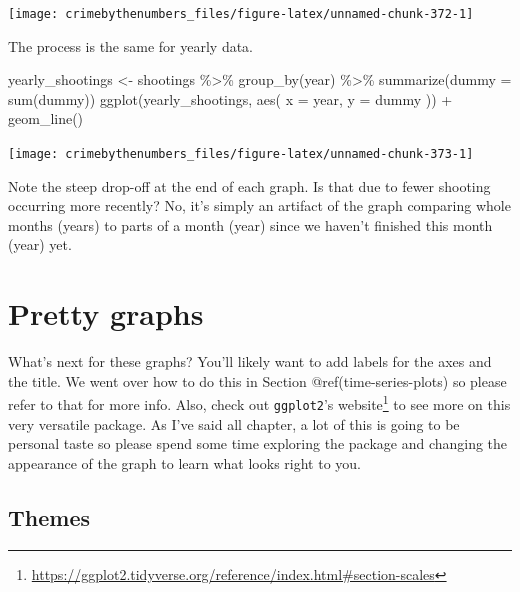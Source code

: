 \documentclass[
  a4paper,
]{krantz}
\makeatletter
\newenvironment{Shaded}{\begin{snugshade}}{\end{snugshade}}
\newcommand{\AttributeTok}[1]{\textcolor[rgb]{0.77,0.63,0.00}{#1}}
\newcommand{\FunctionTok}[1]{\textcolor[rgb]{0.00,0.00,0.00}{#1}}
\newcommand{\NormalTok}[1]{#1}
\newcommand{\OtherTok}[1]{\textcolor[rgb]{0.56,0.35,0.01}{#1}}
\newcommand{\SpecialCharTok}[1]{\textcolor[rgb]{0.00,0.00,0.00}{#1}}
\renewcommand{\href}[2]{#2\footnote{\url{#1}}}
\newenvironment{kframe}{%
\medskip{}
\setlength{\fboxsep}{.8em}
 \def\at@end@of@kframe{}%
 \ifinner\ifhmode%
  \def\at@end@of@kframe{\end{minipage}}%
  \begin{minipage}{\columnwidth}%
 \fi\fi%
 \def\FrameCommand##1{\hskip\@totalleftmargin \hskip-\fboxsep
 \colorbox{shadecolor}{##1}\hskip-\fboxsep
     \hskip-\linewidth \hskip-\@totalleftmargin \hskip\columnwidth}%
 \MakeFramed {\advance\hsize-\width
   \@totalleftmargin\z@ \linewidth\hsize
   \@setminipage}}%
 {\par\unskip\endMakeFramed%
 \at@end@of@kframe}
\renewenvironment{Shaded}{\begin{kframe}}{\end{kframe}}
\makeatother
\begin{document}
\begin{center}\texttt{[image: crimebythenumbers\_files/figure-latex/unnamed-chunk-372-1]} \end{center}

The process is the same for yearly data.

\begin{Shaded}
\begin{Highlighting}[]
\NormalTok{yearly\_shootings }\OtherTok{\textless{}{-}}\NormalTok{ shootings }\SpecialCharTok{\%\textgreater{}\%}
  \FunctionTok{group\_by}\NormalTok{(year) }\SpecialCharTok{\%\textgreater{}\%}
  \FunctionTok{summarize}\NormalTok{(}\AttributeTok{dummy =} \FunctionTok{sum}\NormalTok{(dummy))}
\FunctionTok{ggplot}\NormalTok{(yearly\_shootings, }\FunctionTok{aes}\NormalTok{(}
  \AttributeTok{x =}\NormalTok{ year,}
  \AttributeTok{y =}\NormalTok{ dummy}
\NormalTok{)) }\SpecialCharTok{+}
  \FunctionTok{geom\_line}\NormalTok{()}
\end{Highlighting}
\end{Shaded}

\begin{center}\texttt{[image: crimebythenumbers\_files/figure-latex/unnamed-chunk-373-1]} \end{center}

Note the steep drop-off at the end of each graph. Is that
due to fewer shooting occurring more recently? No, it's
simply an artifact of the graph comparing whole months
(years) to parts of a month (year) since we haven't finished
this month (year) yet.

\hypertarget{pretty-graphs}{%
\section{Pretty graphs}\label{pretty-graphs}}

What's next for these graphs? You'll likely want to add
labels for the axes and the title. We went over how to do
this in Section @ref(time-series-plots) so please refer to
that for more info. Also, check out \texttt{ggplot2}'s
\href{https://ggplot2.tidyverse.org/reference/index.html\#section-scales}{website}
to see more on this very versatile package. As I've said all
chapter, a lot of this is going to be personal taste so
please spend some time exploring the package and changing
the appearance of the graph to learn what looks right to
you.

\hypertarget{themes}{%
\subsection{Themes}\label{themes}}
\end{document}
